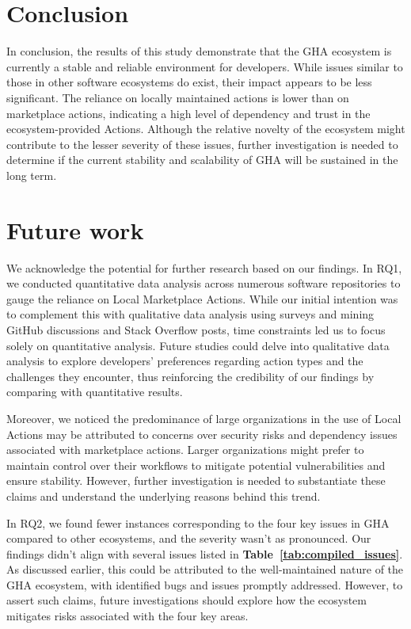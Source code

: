 \documentclass[conference]{IEEEtran}
\begin{document}
\section{Conclusion}
	In conclusion, the results of this study demonstrate that the GHA ecosystem is currently a stable and reliable environment for developers. While issues similar to those in other software ecosystems do exist, their impact appears to be less significant. The reliance on locally maintained actions is lower than on marketplace actions, indicating a high level of dependency and trust in the ecosystem-provided Actions. Although the relative novelty of the ecosystem might contribute to the lesser severity of these issues, further investigation is needed to determine if the current stability and scalability of GHA will be sustained in the long term.

\section{Future work}
	We acknowledge the potential for further research based on our findings. In RQ1, we conducted quantitative data analysis across numerous software repositories to gauge the reliance on Local Marketplace Actions. While our initial intention was to complement this with qualitative data analysis using surveys and mining GitHub discussions and Stack Overflow posts, time constraints led us to focus solely on quantitative analysis. Future studies could delve into qualitative data analysis to explore developers' preferences regarding action types and the challenges they encounter, thus reinforcing the credibility of our findings by comparing with quantitative results.

	Moreover, we noticed the predominance of large organizations in the use of Local Actions may be attributed to concerns over security risks and dependency issues associated with marketplace actions. Larger organizations might prefer to maintain control over their workflows to mitigate potential vulnerabilities and ensure stability. However, further investigation is needed to substantiate these claims and understand the underlying reasons behind this trend.

	In RQ2, we found fewer instances corresponding to the four key issues in GHA compared to other ecosystems, and the severity wasn't as pronounced. Our findings didn't align with several issues listed in \textbf{Table~\ref{tab:compiled_issues}}. As discussed earlier, this could be attributed to the well-maintained nature of the GHA ecosystem, with identified bugs and issues promptly addressed. However, to assert such claims, future investigations should explore how the ecosystem mitigates risks associated with the four key areas.
\end{document}
